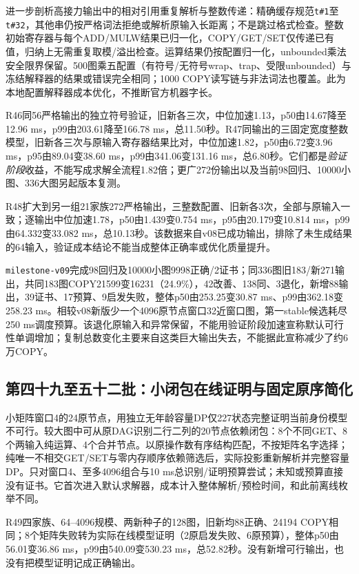 \documentclass[UTF8,11pt,fontset=fandol]{ctexart}
\begin{document}
进一步剖析高接力输出中的相对引用重复解析与整数传递：精确缓存规范\texttt{t\#1}至\texttt{t\#32}，其他串仍按严格词法拒绝或解析原输入长距离；不是跳过格式检查。整数初始寄存器与每个ADD/MULW结果已归一化，COPY/GET/SET仅传递已有值，归纳上无需重复取模/溢出检查。运算结果仍按配置归一化，unbounded乘法安全限界保留。500图乘五配置（有符号/无符号wrap、trap、受限unbounded）与冻结解释器的结果或错误完全相同；1000 COPY读写链与非法词法也覆盖。此为本地配置解释器成本优化，不推断官方机器字长。

R46同56严格输出的独立符号验证，旧新各三次，中位加速1.13，p50由14.67降至12.96 ms，p99由203.61降至166.78 ms，总11.50秒。R47同输出的三固定宽度整数模型，旧新各三次与原输入寄存器结果比对，中位加速1.82，p50由6.72变3.96 ms，p95由89.04变38.60 ms，p99由341.06变131.16 ms，总6.80秒。它们都是\emph{验证阶段}收益，不能写成求解全流程1.82倍；更广272份输出以及当前98回归、10000小图、336大图另起版本复测。

R48扩大到另一组21家族272严格输出，三整数配置、旧新各3次，全部与原输入一致；逐输出中位加速1.78，p50由1.439变0.754 ms，p95由20.179变10.814 ms，p99由64.332变33.082 ms，总10.13秒。该数据来自v08已成功输出，排除了未生成结果的64输入，验证成本结论不能当成整体正确率或优化质量提升。

\texttt{milestone-v09}完成98回归及10000小图9998正确/2证书；同336图旧183/新271输出，共同183图COPY21599变16231（24.9\%），42改善、138同、3退化，新增88输出，39证书、17预算、9启发失败，整体p50由253.25变30.87 ms、p99由362.18变258.23 ms。相较v08新版少一个4096原节点窗口32近窗口图，第一stable候选耗尽250 ms调度预算。该退化原输入和异常保留，不能用验证阶段加速宣称默认可行性单调增加；复制总数变化主要来自这类巨大输出失去，不能据此宣称减少了约6万COPY。

\subsection{第四十九至五十二批：小闭包在线证明与固定原序简化}
小矩阵窗口4的24原节点，用独立无年龄容量DP仅227状态完整证明当前身份模型不可行。较大图中可从原DAG识别二行二列的20节点依赖闭包：8个不同GET、8个两输入纯运算、4个合并节点。以原操作数有序结构匹配，不按矩阵名字选择；纯唯一不相交GET/SET与零内存顺序依赖筛选后，实际投影重新解析并完整容量DP。只对窗口4、至多4096组合与10 ms总识别/证明预算尝试；未知或预算直接没有证书。它首次进入默认求解器，成本计入整体解析/预检时间，和此前离线枚举不同。

R49四家族、64--4096规模、两新种子的128图，旧新均88正确、24194 COPY相同；8个矩阵失败转为实际在线模型证明（2原启发失败、6原预算），整体p50由56.01变36.86 ms，p99由540.09变530.23 ms，总52.82秒。没有新增可行输出，也没有把模型证明记成正确输出。
\end{document}
